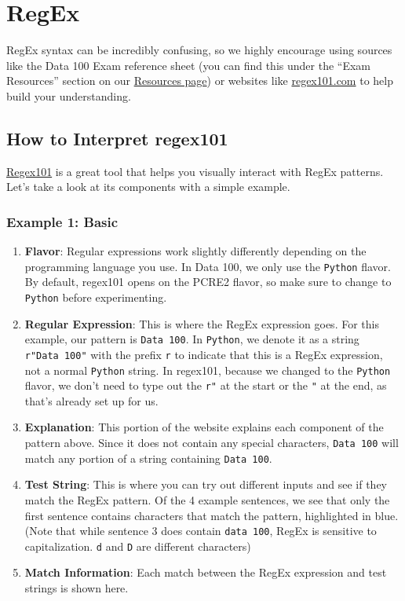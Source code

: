 \documentclass[
  letterpaper,
  DIV=11,
  numbers=noendperiod]{scrreprt}
\providecommand{\tightlist}{%
  \setlength{\itemsep}{0pt}\setlength{\parskip}{0pt}}\usepackage{longtable,booktabs,array}
\begin{document}

\chapter{RegEx}\label{regex}

RegEx syntax can be incredibly confusing, so we highly encourage using
sources like the Data 100 Exam reference sheet (you can find this under
the ``Exam Resources'' section on our
\href{https://ds100.org/sp24/resources/}{Resources page}) or websites
like \href{https://regex101.com/}{regex101.com} to help build your
understanding.

\section{How to Interpret regex101}\label{how-to-interpret-regex101}

\href{https://regex101.com/}{Regex101} is a great tool that helps you
visually interact with RegEx patterns. Let's take a look at its
components with a simple example.

\subsection{Example 1: Basic}\label{example-1-basic}

\begin{enumerate}
\def\labelenumi{\arabic{enumi}.}
\setcounter{enumi}{-1}
\tightlist
\item
  \textbf{Flavor}: Regular expressions work slightly differently
  depending on the programming language you use. In Data 100, we only
  use the \texttt{Python} flavor. By default, regex101 opens on the
  PCRE2 flavor, so make sure to change to \texttt{Python} before
  experimenting.
\item
  \textbf{Regular Expression}: This is where the RegEx expression goes.
  For this example, our pattern is \texttt{Data\ 100}. In
  \texttt{Python}, we denote it as a string \texttt{r"Data\ 100"} with
  the prefix \texttt{r} to indicate that this is a RegEx expression, not
  a normal \texttt{Python} string. In regex101, because we changed to
  the \texttt{Python} flavor, we don't need to type out the \texttt{r"}
  at the start or the \texttt{"} at the end, as that's already set up
  for us.
\item
  \textbf{Explanation}: This portion of the website explains each
  component of the pattern above. Since it does not contain any special
  characters, \texttt{Data\ 100} will match any portion of a string
  containing \texttt{Data\ 100}.
\item
  \textbf{Test String}: This is where you can try out different inputs
  and see if they match the RegEx pattern. Of the 4 example sentences,
  we see that only the first sentence contains characters that match the
  pattern, highlighted in blue. (Note that while sentence 3 does contain
  \texttt{data\ 100}, RegEx is sensitive to capitalization. \texttt{d}
  and \texttt{D} are different characters)
\item
  \textbf{Match Information}: Each match between the RegEx expression
  and test strings is shown here.
\end{enumerate}
\end{document}
